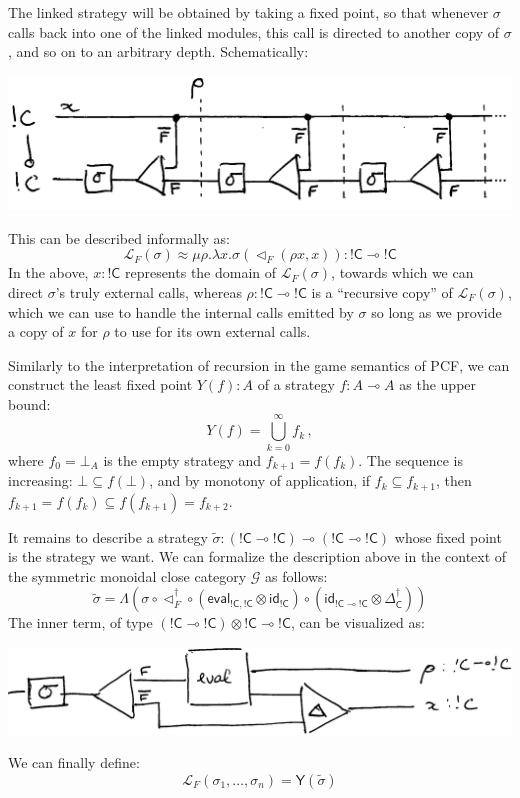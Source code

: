 \documentclass[sigplan,10pt,review,anonymous]{acmart}
\newcommand{\kw}[1]{\ensuremath{ \textsf{#1} }}
\newcommand{\EC}{\kw{C}}
\begin{document}
The linked strategy will be obtained by taking a fixed point,
so that whenever $\sigma$ calls back into one of the linked modules,
this call is directed to another copy of $\sigma$,
and so on to an arbitrary depth.
Schematically:
\begin{center}
  \includegraphics[scale=0.7]{linking-operator}
\end{center}
This can be described informally as:
\[
  \mathcal{L}_F(\sigma) \approx
  \mu \rho . \lambda x . \sigma (\lhd_F (\rho x, x))
  : {!\EC} \multimap {!\EC}
\]
In the above,
$x : {!\EC}$ represents the domain of $\mathcal{L}_F(\sigma)$,
towards which we can direct $\sigma$'s truly external calls,
whereas $\rho : {!\EC} \multimap {!\EC}$ is a ``recursive copy'' of $\mathcal{L}_F(\sigma)$,
which we can use to handle the internal calls emitted by $\sigma$
so long as we provide a copy of $x$
for $\rho$ to use for its own external calls.

Similarly to the interpretation of recursion
in the game semantics of PCF,
we can construct the least fixed point $Y(f) : A$
of a strategy $f : A \multimap A$
as the upper bound:
\[
  Y(f) = \bigcup_{k=0}^\infty f_k\,,
\]
where $f_0 = \bot_{A}$ is the empty strategy
and $f_{k+1} = f(f_k)$.
The sequence is increasing:
$\bot \subseteq f(\bot)$,
and by monotony of application,
if $f_k \subseteq f_{k+1}$,
then $f_{k+1} = f(f_k) \subseteq f(f_{k+1}) = f_{k+2}$.

It remains to describe a strategy
$\tilde{\sigma} : ({!\EC} \multimap {!\EC}) \multimap ({!\EC} \multimap {!\EC})$
whose fixed point is the strategy we want.
We can formalize the description above
in the context of the symmetric monoidal close category $\mathcal{G}$
as follows:
\[
  \tilde{\sigma} =
    \Lambda
      \left(
      \sigma \circ
      \lhd_F^\dagger \circ
      (\kw{eval}_{{!\EC}, {!\EC}} \otimes \kw{id}_{!\EC}) \circ
      (\kw{id}_{{!\EC} \multimap {!\EC}} \otimes \Delta_\EC^\dagger)
      \right)
\]
The inner term,
of type $({!\EC} \multimap {!\EC}) \otimes {!\EC} \multimap {!\EC}$,
can be visualized as:
\begin{center}
  \includegraphics[scale=0.6]{linking-element}
\end{center}
We can finally define:
\[
  \mathcal{L}_F(\sigma_1, \ldots, \sigma_n) = \kw{Y}(\tilde{\sigma})
\]
\end{document}
